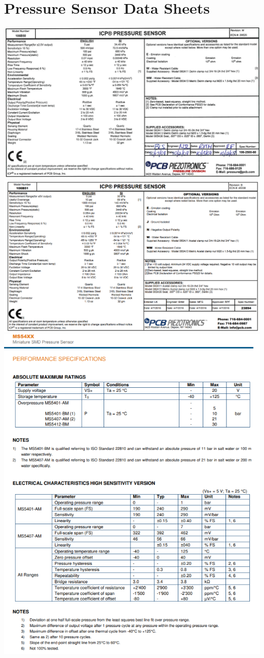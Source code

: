 \usepackage{appendix}
\appendix
\section{Pressure Sensor Data Sheets}

\includegraphics[width=1\columnwidth]{figures/106B50 DS.PNG}
\includegraphics[width=1\columnwidth]{figures/106B51 DS.PNG}
\includegraphics[width=1\columnwidth]{figures/MS5401-AM DS.png}

